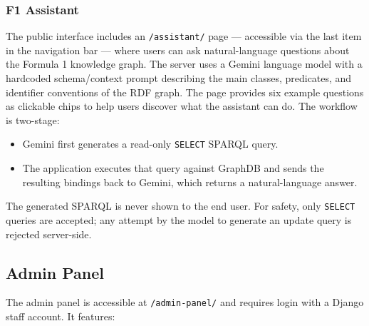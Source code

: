 \documentclass[12pt,a4paper]{article}
\begin{document}
\subsubsection{F1 Assistant}

The public interface includes an \texttt{/assistant/} page — accessible via the
last item in the navigation bar — where users can ask natural-language questions
about the Formula 1 knowledge graph. The server uses a Gemini language model
with a hardcoded schema/context prompt describing the main classes, predicates,
and identifier conventions of the RDF graph. The page provides six example
questions as clickable chips to help users discover what the assistant can do.
The workflow is two-stage:

\begin{itemize}[leftmargin=1.5em]
  \item Gemini first generates a read-only \texttt{SELECT} SPARQL query.
  \item The application executes that query against GraphDB and sends the
        resulting bindings back to Gemini, which returns a natural-language answer.
\end{itemize}

The generated SPARQL is never shown to the end user. For safety, only
\texttt{SELECT} queries are accepted; any attempt by the model to generate an
update query is rejected server-side.

\subsection{Admin Panel}

The admin panel is accessible at \texttt{/admin-panel/} and requires login with
a Django staff account. It features:
\end{document}

